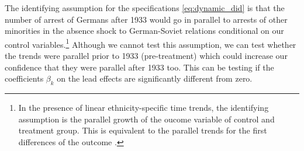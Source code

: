 



The identifying assumption for the specifications \ref{eq:dynamic_did} is that the number of arrest of Germans after 1933 would go in parallel to arrests of other minorities in the absence shock to German-Soviet relations conditional on our control variables.\footnote{In the presence of linear ethnicity-specific time trends, the identifying assumption  is the parallel growth of the oucome variable of control and treatment group. This is equivalent to the parallel trends for the first differences of the outcome \citep{mora_alternative_2017}. } Although we cannot test this assumption, we can test whether the trends were parallel prior to 1933 (pre-treatment) which could increase our confidence that they were parallel after 1933 too. This can be testing if the coefficients $\beta_k$ on the lead effects are significantly different from zero.  

